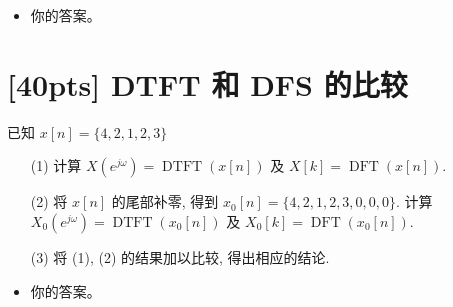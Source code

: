 \documentclass[tikz,a4paper,UTF8]{article}
\numberwithin{equation}{section}
\begin{document}
\begin{framed}
    \begin{spacing}{1.5}
        \begin{itemize}
            \item 你的答案。
        \end{itemize}
    \end{spacing}
\end{framed}


\newpage
\section{[40pts] DTFT 和 DFS 的比较}
\noindent 已知 $x[n]=\{4,2,1,2,3\}$
\begin{itemize}
	\item[(1)]计算 $X({e}^{{j}\omega})=\operatorname{DTFT}(x[n])$ 及 $X[k]=\operatorname{DFT}(x[n])$.
	\item[(2)]将 $x[n]$ 的尾部补零, 得到 $x_0[n]=\{4,2,1,2,3,0,0,0\}$. 计算 $X_0({e}^{j \omega})=\operatorname{DTFT}(x_0[n])$ 及 $X_0[k]=\operatorname{DFT}(x_0[n])$.
	\item[(3)]将 (1), (2) 的结果加以比较, 得出相应的结论.
\end{itemize}





\begin{framed}
	\begin{spacing}{1.5}
		\begin{itemize}
			\item 你的答案。
		\end{itemize}
	\end{spacing}
\end{framed}
\end{document}

